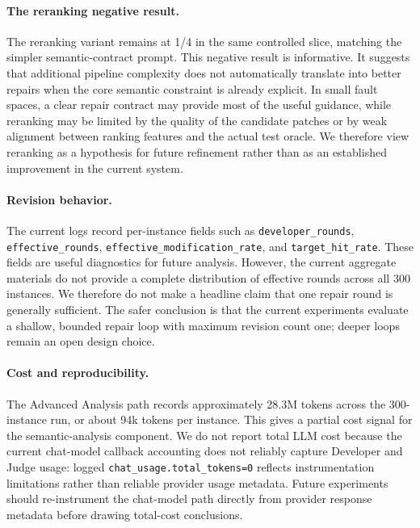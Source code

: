 \documentclass[11pt]{article}
\begin{document}
\paragraph{The reranking negative result.}
The reranking variant remains at 1/4 in the same controlled slice, matching the simpler semantic-contract prompt.  This negative result is informative.  It suggests that additional pipeline complexity does not automatically translate into better repairs when the core semantic constraint is already explicit.  In small fault spaces, a clear repair contract may provide most of the useful guidance, while reranking may be limited by the quality of the candidate patches or by weak alignment between ranking features and the actual test oracle.  We therefore view reranking as a hypothesis for future refinement rather than as an established improvement in the current system.

\paragraph{Revision behavior.}
The current logs record per-instance fields such as \texttt{developer\_rounds}, \texttt{effective\_rounds}, \texttt{effective\_modification\_rate}, and \texttt{target\_hit\_rate}.  These fields are useful diagnostics for future analysis.  However, the current aggregate materials do not provide a complete distribution of effective rounds across all 300 instances.  We therefore do not make a headline claim that one repair round is generally sufficient.  The safer conclusion is that the current experiments evaluate a shallow, bounded repair loop with maximum revision count one; deeper loops remain an open design choice.

\paragraph{Cost and reproducibility.}
The Advanced Analysis path records approximately 28.3M tokens across the 300-instance run, or about 94k tokens per instance.  This gives a partial cost signal for the semantic-analysis component.  We do not report total LLM cost because the current chat-model callback accounting does not reliably capture Developer and Judge usage: logged \texttt{chat\_usage.total\_tokens=0} reflects instrumentation limitations rather than reliable provider usage metadata.  Future experiments should re-instrument the chat-model path directly from provider response metadata before drawing total-cost conclusions.
\end{document}
